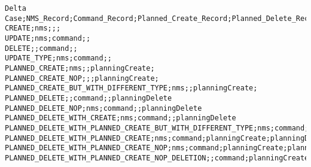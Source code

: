 \begin{lstlisting}[caption=Konfigurationsdatei für Deltafälle im CSV-Format, label=deltaConfig,language=csv,basicstyle=\scriptsize\ttfamily]
Delta Case;NMS_Record;Command_Record;Planned_Create_Record;Planned_Delete_Record
CREATE;nms;;;
UPDATE;nms;command;;
DELETE;;command;;
UPDATE_TYPE;nms;command;;
PLANNED_CREATE;nms;;planningCreate;
PLANNED_CREATE_NOP;;;planningCreate;
PLANNED_CREATE_BUT_WITH_DIFFERENT_TYPE;nms;;planningCreate;
PLANNED_DELETE;;command;;planningDelete
PLANNED_DELETE_NOP;nms;command;;planningDelete
PLANNED_DELETE_WITH_CREATE;nms;command;;planningDelete
PLANNED_DELETE_WITH_PLANNED_CREATE_BUT_WITH_DIFFERENT_TYPE;nms;command;planningCreate;planningDelete
PLANNED_DELETE_WITH_PLANNED_CREATE;nms;command;planningCreate;planningDelete
PLANNED_DELETE_WITH_PLANNED_CREATE_NOP;nms;command;planningCreate;planningDelete
PLANNED_DELETE_WITH_PLANNED_CREATE_NOP_DELETION;;command;planningCreate;planningDelete
\end{lstlisting}

